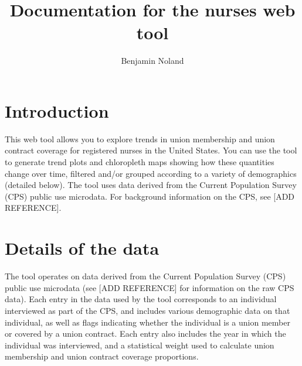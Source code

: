 \documentclass[letterpaper,12pt]{article}
\title{Documentation for the nurses web tool}
\author{Benjamin Noland}
\date{}
\begin{document}
\maketitle
\tableofcontents

\section{Introduction}

This web tool allows you to explore trends in union membership and
union contract coverage for registered nurses in the United
States. You can use the tool to generate trend plots and chloropleth
maps showing how these quantities change over time, filtered and/or
grouped according to a variety of demographics (detailed below). The
tool uses data derived from the Current Population Survey (CPS) public
use microdata. For background information on the CPS, see [ADD
REFERENCE].

\section{Details of the data}

The tool operates on data derived from the Current Population Survey
(CPS) public use microdata (see [ADD REFERENCE] for information on the
raw CPS data).  Each entry in the data used by the tool corresponds to
an individual interviewed as part of the CPS, and includes various
demographic data on that individual, as well as flags indicating
whether the individual is a union member or covered by a union
contract. Each entry also includes the year in which the individual
was interviewed, and a statistical weight used to calculate union
membership and union contract coverage proportions.
\end{document}
